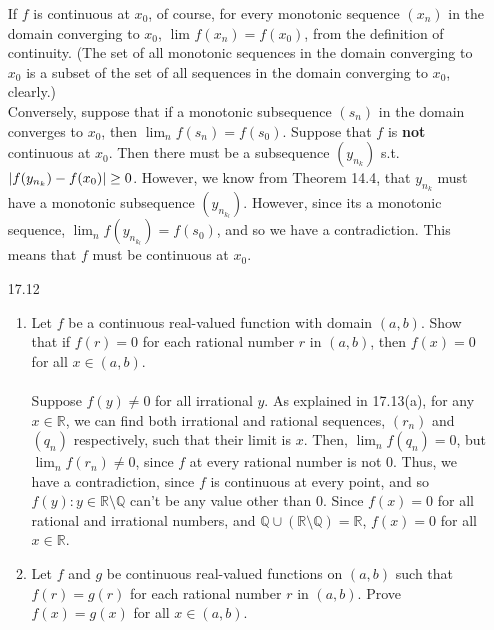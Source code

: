 \begin{enumerate}
    If $f$ is continuous at $x_0$, of course, for every monotonic sequence $(x_n)$ in the domain converging to $x_0$, $\lim_{} f(x_n) = f(x_0)$, from the definition of continuity. (The set of all monotonic sequences in the domain converging to $x_0$ is a subset of the set of all sequences in the domain converging to $x_0$, clearly.)\\

    Conversely, suppose that if a monotonic subsequence $(s_n)$ in the domain converges to $x_0$, then $\lim_{n} f(s_n) = f(s_0)$. Suppose that $f$ is \textbf{not} continuous at $x_0$. Then there must be a subsequence $(y_{n_k})$ s.t. $\left\vert f(y_{n_k}) - f(x_0) \right\vert \geq 0$. However, we know from Theorem 14.4, that $y_{n_k}$ must have a monotonic subsequence $(y_{n_{k_l}})$. However, since its a monotonic sequence, $\lim_{n} f(y_{n_{k_l}}) = f(s_0)$, and so we have a contradiction. This means that $f$ must be continuous at $x_0$.

    
  \item [17.12]
    \begin{enumerate}
      \item Let $f$ be a continuous real-valued function with domain $(a,b)$. Show that if $f(r) = 0$ for each rational number $r$ in $(a,b)$, then $f(x) = 0$ for all $x \in (a,b)$.\\\\

        Suppose $f(y) \neq 0$ for all irrational $y$. As explained in 17.13(a), for any $x \in \mathds{R}$, we can find both irrational and rational sequences, $(r_n)$ and $(q_n)$ respectively, such that their limit is $x$. Then, $\lim_{n} f(q_n) = 0$, but $\lim_{n} f(r_n) \neq 0$, since $f$ at every rational number is not $0$. Thus, we have a contradiction, since $f$ is continuous at every point, and so $f(y) : y \in \mathds{R} \setminus \mathds{Q}$ can't be any value other than 0. Since $f(x) = 0$ for all rational and irrational numbers, and $\mathds{Q} \cup (\mathds{R} \setminus \mathds{Q}) = \mathds{R}$, $f(x) = 0$ for all $x \in \mathds{R}$.
        
      \item Let $f$ and $g$ be continuous real-valued functions on $(a,b)$ such that $f(r) = g(r)$ for each rational number $r$ in $(a,b)$. Prove $f(x) = g(x)$ for all $x \in (a,b)$.\\\\


\end{enumerate}
\end{enumerate}

